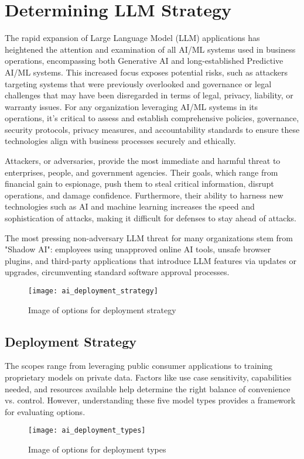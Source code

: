 

\headerimage
\chapter{Determining LLM Strategy}
The rapid expansion of Large Language Model (LLM) applications has heightened
the attention and examination of all AI/ML systems used in business operations,
encompassing both Generative AI and long-established Predictive AI/ML systems.
This increased focus exposes potential risks, such as attackers targeting
systems that were previously overlooked and governance or legal challenges that
may have been disregarded in terms of legal, privacy, liability, or warranty
issues. For any organization leveraging AI/ML systems in its operations, it's
critical to assess and establish comprehensive policies, governance, security
protocols, privacy measures, and accountability standards to ensure these
technologies align with business processes securely and ethically.

Attackers, or adversaries, provide the most immediate and harmful threat to
enterprises, people, and government agencies. Their goals, which range from
financial gain to espionage, push them to steal critical information, disrupt
operations, and damage confidence. Furthermore, their ability to harness new
technologies such as AI and machine learning increases the speed and
sophistication of attacks, making it difficult for defenses to stay ahead of
attacks.

The most pressing non-adversary LLM threat for many organizations stem from
"Shadow AI": employees using unapproved online AI tools, unsafe browser
plugins, and third-party applications that introduce LLM features via updates
or upgrades, circumventing standard software approval processes.

\begin{figure}[h]
  \centering
  \texttt{[image: ai\_deployment\_strategy]}
  \caption{Image of options for deployment strategy}
  \label{fig:llm-deployment-strategy}
\end{figure}

\clearpage

\section{Deployment Strategy}
The scopes range from leveraging public consumer applications to training
proprietary models on private data. Factors like use case sensitivity,
capabilities needed, and resources available help determine the right balance
of convenience vs. control. However, understanding these five model types
provides a framework for evaluating options.

\begin{figure}[h]
  \centering
  \texttt{[image: ai\_deployment\_types]}
  \caption{Image of options for deployment types}
  \label{fig:llm-deployment-types}
\end{figure}
